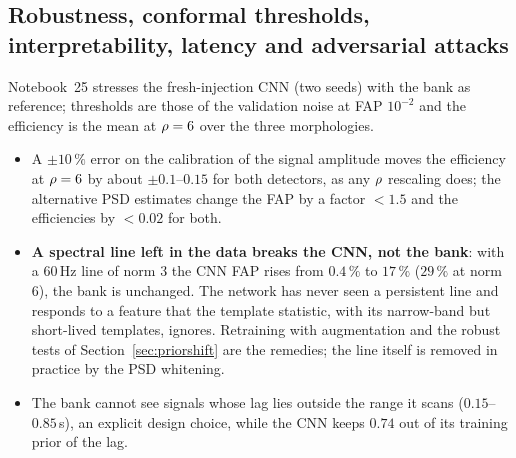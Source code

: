 \subsection{Robustness, conformal thresholds, interpretability, latency and adversarial attacks}\label{sec:robust}
Notebook~25 stresses the fresh-injection CNN (two seeds) with the bank as reference; thresholds are those of the validation noise at FAP $10^{-2}$ and the efficiency is the mean at $\rho=6$ over the three morphologies.
\begin{table}[h]\centering\small
{}
\caption{Robustness of the bank and of the CNN to one perturbation at a time (nominal thresholds).}\label{tab:robust}
\end{table}
\begin{itemize}[nosep]
\item A $\pm10\,\%$ error on the calibration of the signal amplitude moves the efficiency at $\rho=6$ by about $\pm0.1$--$0.15$ for both detectors, as any $\rho$ rescaling does; the alternative PSD estimates change the FAP by a factor $<1.5$ and the efficiencies by $<0.02$ for both.
\item \textbf{A spectral line left in the data breaks the CNN, not the bank}: with a $60\,$Hz line of norm $3$ the CNN FAP rises from $0.4\,\%$ to $17\,\%$ ($29\,\%$ at norm $6$), the bank is unchanged. The network has never seen a persistent line and responds to a feature that the template statistic, with its narrow-band but short-lived templates, ignores. Retraining with augmentation and the robust tests of Section~\ref{sec:priorshift} are the remedies; the line itself is removed in practice by the PSD whitening.
\item The bank cannot see signals whose lag lies outside the range it scans ($0.15$--$0.85\,$s), an explicit design choice, while the CNN keeps $0.74$ out of its training prior of the lag.
\end{itemize}
